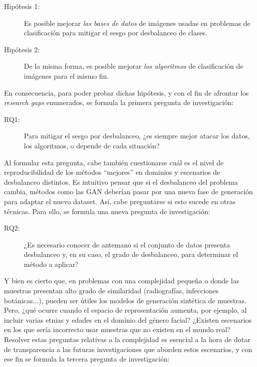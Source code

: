 \begin{description}
    \item[Hipótesis 1:] Es posible mejorar \textit{las bases de datos} de imágenes usadas en problemas de clasificación para mitigar el sesgo por desbalanceo de clases.
    \item[Hipótesis 2:] De la misma forma, es posible mejorar \textit{los algoritmos} de clasificación de imágenes para el mismo fin.
\end{description}

En consecuencia, para poder probar dichas hipótesis, y con el fin de afrontar los \textit{research gaps} enumerados, se formula la primera pregunta de investigación:

\begin{description}
    \item[RQ1:] Para mitigar el sesgo por desbalanceo, ¿es siempre mejor atacar los datos, los algoritmos, o depende de cada situación?
\end{description}

Al formular esta pregunta, cabe también cuestionarse cuál es el nivel de reproducibilidad de los métodos ``mejores'' en dominios y escenarios de desbalanceo distintos. Es intuitivo pensar que si el desbalanceo del problema cambia, métodos como las GAN deberían pasar por una nueva fase de generación para adaptar el nuevo dataset. Así, cabe preguntarse si esto sucede en otras técnicas. Para ello, se formula una nueva pregunta de investigación:

\begin{description}
    \item[RQ2:] ¿Es necesario conocer de antemano si el conjunto de datos presenta desbalanceo y, en su caso, el grado de desbalanceo, para determinar el método a aplicar?
\end{description}

Y bien es cierto que, en problemas con una complejidad pequeña o donde las muestras presentan alto grado de similaridad (radiografías, infecciones botánicas...), pueden ser útiles los modelos de generación sintética de muestras. Pero, ¿qué ocurre cuando el espacio de representación aumenta, por ejemplo, al incluir varias etnias y edades en el dominio del género facial? ¿Existen escenarios en los que sería incorrecto usar muestras que no existen en el mundo real? Resolver estas preguntas relativas a la complejidad es esencial a la hora de dotar de transparencia a las futuras investigaciones que aborden estos escenarios, y con ese fin se formula la tercera pregunta de investigación:

